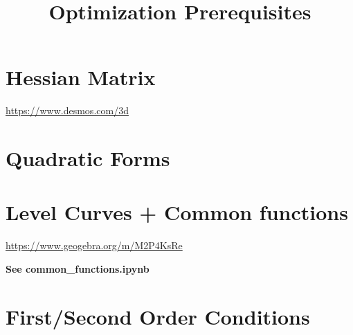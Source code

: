 \documentclass{beamer}
\title{Optimization Prerequisites}
\author{ }
\date{ }
\begin{document}
\begin{frame}
   	\titlepage
\end{frame}

\section{Hessian Matrix}



\url{https://www.desmos.com/3d} %

\section{Quadratic Forms}






\section{Level Curves + Common functions}

\url{https://www.geogebra.org/m/M2P4KsRe} %

\textbf{See common\_functions.ipynb} %

\section{First/Second Order Conditions}


\end{document}
